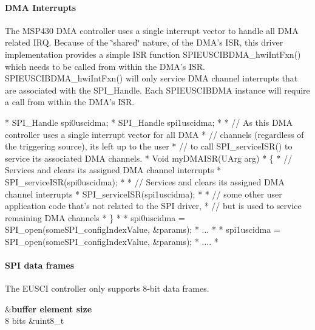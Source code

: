 \paragraph*{D\-M\-A Interrupts}

The M\-S\-P430 D\-M\-A controller uses a single interrupt vector to handle all D\-M\-A related I\-R\-Q. Because of the \char`\"{}shared\char`\"{} nature, of the D\-M\-A's I\-S\-R, this driver implementation provides a simple I\-S\-R function S\-P\-I\-E\-U\-S\-C\-I\-B\-D\-M\-A\-\_\-hwi\-Int\-Fxn() which needs to be called from within the D\-M\-A's I\-S\-R. S\-P\-I\-E\-U\-S\-C\-I\-B\-D\-M\-A\-\_\-hwi\-Int\-Fxn() will only service D\-M\-A channel interrupts that are associated with the S\-P\-I\-\_\-\-Handle. Each S\-P\-I\-E\-U\-S\-C\-I\-B\-D\-M\-A instance will require a call from within the D\-M\-A's I\-S\-R.


\begin{DoxyCode}
*  SPI_Handle spi0uscidma;
*  SPI_Handle spi1uscidma;
*
*  \textcolor{comment}{// As this DMA controller uses a single interrupt vector for all DMA}
*  \textcolor{comment}{// channels (regardless of the triggering source), its left up to the user}
*  \textcolor{comment}{// to call SPI\_serviceISR() to service its associated DMA channels.}
*  Void myDMAISR(UArg arg)
*  \{
*      \textcolor{comment}{// Services and clears its assigned DMA channel interrupts}
*      SPI_serviceISR(spi0uscidma);
*
*      \textcolor{comment}{// Services and clears its assigned DMA channel interrupts}
*      SPI_serviceISR(spi1uscidma);
*
*      \textcolor{comment}{// some other user application code that's not related to the SPI driver,}
*      \textcolor{comment}{// but is used to service remaining DMA channels}
*  \}
*
*  spi0uscidma = SPI_open(someSPI\_configIndexValue, &params);
*  ...
*
*  spi1uscidma = SPI_open(someSPI\_configIndexValue, &params);
*  ....
*  
\end{DoxyCode}


\paragraph*{S\-P\-I data frames}

The E\-U\-S\-C\-I controller only supports 8-\/bit data frames.

\begin{TabularC}{2}
\hline
{}&{\bf buffer element size  }\\
8 bits &uint8\-\_\-t \\
\end{TabularC}
